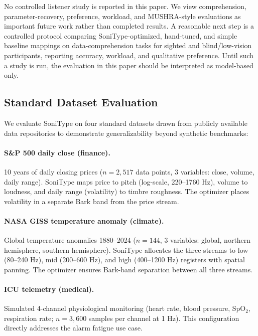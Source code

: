 \documentclass[sigchi, nonacm]{acmart}
\begin{document}
No controlled listener study is reported in this paper. We view comprehension, parameter-recovery, preference, workload, and MUSHRA-style evaluations as important future work rather than completed results. A reasonable next step is a controlled protocol comparing SoniType-optimized, hand-tuned, and simple baseline mappings on data-comprehension tasks for sighted and blind/low-vision participants, reporting accuracy, workload, and qualitative preference. Until such a study is run, the evaluation in this paper should be interpreted as model-based only.

\subsection{Standard Dataset Evaluation}
\label{sec:standard_datasets}

We evaluate SoniType on four standard datasets drawn from publicly available data repositories to demonstrate generalizability beyond synthetic benchmarks:

\paragraph{S\&P 500 daily close (finance).} 10 years of daily closing prices ($n = 2{,}517$ data points, 3 variables: close, volume, daily range). SoniType maps price to pitch (log-scale, 220--1760 Hz), volume to loudness, and daily range (volatility) to timbre roughness. The optimizer places volatility in a separate Bark band from the price stream.

\paragraph{NASA GISS temperature anomaly (climate).} Global temperature anomalies 1880--2024 ($n = 144$, 3 variables: global, northern hemisphere, southern hemisphere). SoniType allocates the three streams to low (80--240 Hz), mid (200--600 Hz), and high (400--1200 Hz) registers with spatial panning. The optimizer ensures Bark-band separation between all three streams.

\paragraph{ICU telemetry (medical).} Simulated 4-channel physiological monitoring (heart rate, blood pressure, SpO$_2$, respiration rate; $n = 3{,}600$ samples per channel at 1 Hz). This configuration directly addresses the alarm fatigue use case.
\end{document}
